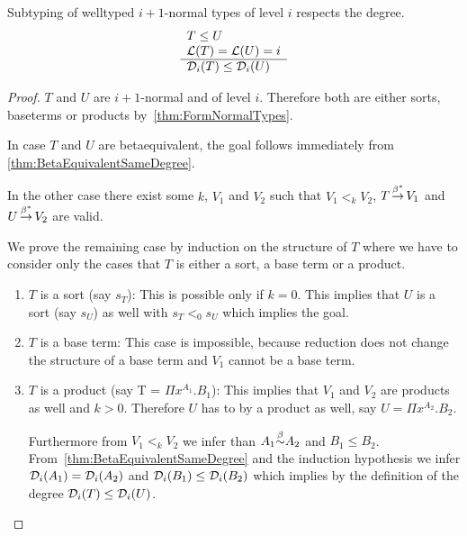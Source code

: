 \begin{theorem}
    Subtyping of welltyped $i+1$-normal types of level $i$ respects the degree.
    $$
    \begin{array}{l} 
        T \le U
        \\
        {\cal L}(T) = {\cal L}(U) = i
     \\ \hline 
        {\cal D}_i(T) \le {\cal D}_i(U)
    \end{array}
    $$
    \begin{proof}
        $T$ and $U$ are $i+1$-normal and of level $i$. Therefore both are either
        sorts, baseterms or products by~\ref{thm:FormNormalTypes}.

        In case $T$ and $U$ are betaequivalent, the goal follows immediately
        from \ref{thm:BetaEquivalentSameDegree}.

        In the other case there exist some $k$, $V_1$ and $V_2$ such that $V_1
        <_k V_2$, $T {\,\stackrel{\beta^*}{\to}\,} V_1$ and $U {\,\stackrel{\beta^*}{\to}\,} V_2$ are valid.

        We prove the remaining case by induction on the structure of $T$ where
        we have to consider only the cases that $T$ is either a sort, a base
        term or a product.

        \begin{enumerate}
            \item $T$ is a sort (say $s_T$): This is possible only if $k=0$. This
                implies that $U$ is a sort (say $s_U$) as well with $s_T <_0
                s_U$ which implies the goal. 

            \item $T$ is a base term: This case is impossible, because reduction
                does not change the structure of a base term and $V_1$
                cannot be a base term.

            \item $T$ is a product (say T = $\Pi x^{A_1}. B_1$): This implies that
                $V_1$ and $V_2$ are products as well and $k > 0$. Therefore $U$ has
                to by a product as well, say $U = \Pi x^{A_2}. B_2$.

                Furthermore from $V_1 <_k V_2$ we infer than $A_1 {\stackrel{\beta}{\sim}} A_2$
                and $B_1 \le B_2$. From~\ref{thm:BetaEquivalentSameDegree} and
                the induction hypothesis we infer ${\cal D}_i(A_1) =
                {\cal D}_i(A_2)$ and ${\cal D}_i(B_1) \le {\cal D}_i(B_2)$ which
                implies by the definition of the degree ${\cal D}_i(T) \le
                {\cal D}_i(U)$.
        \end{enumerate}
    \end{proof}
\end{theorem}






